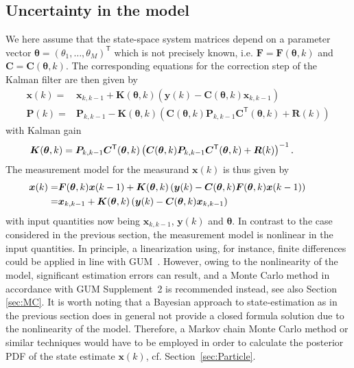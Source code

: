 \documentclass[10pt]{article}
\begin{document}
\begin{spacing}{1}
\subsection{Uncertainty in the model}
\label{sec:LKF_uncertain}
We here assume that the state-space system matrices depend on a parameter vector $\bm{\theta}=(\theta_1,\ldots,\theta_M)^{\mathsf{T}}$ which is not precisely known, i.e. $\bm{F}=\bm{F}(\bm{\theta},k)$ and $\bm{C}=\bm{C}(\bm{\theta},k)$. The corresponding equations for the correction step of the Kalman filter are then given by
\begin{align}
	\bm{x}(k) =& \bm{x}_{k,k-1} + \bm{K}(\bm{\theta},k) \left( \bm{y}(k) - \bm{C}(\bm{\theta},k)\bm{x}_{k,k-1} \right) \\
	\bm{P}(k) =& \bm{P}_{k,k-1} - \bm{K}(\bm{\theta},k) \left( \bm{C}(\bm{\theta},k)\bm{P}_{k,k-1}\bm{C}^{\mathsf{T}}(\bm{\theta},k) + \bm{R}(k) \right)
\end{align}
with Kalman gain
\begin{equation}
	\hspace{-8ex}\bm{K}(\bm{\theta},k) = \bm{P}_{k,k-1}\bm{C}^{\mathsf{T}}(\bm{\theta},k) \left( \bm{C}(\bm{\theta},k)\bm{P}_{k,k-1}\bm{C}^{\mathsf{T}}(\bm{\theta},k)+\bm{R}(k) \right)^{-1} .
\end{equation}
The measurement model for the measurand $\bm{x}(k)$ is thus given by
\begin{align}
	\hspace{-8ex}\bm{x}(k) =& \bm{F}(\bm{\theta},k)\bm{x}(k-1) + \bm{K}(\bm{\theta},k) \left( \bm{y}(k) - \bm{C}(\bm{\theta},k)\bm{F}(\bm{\theta},k)\bm{x}(k-1) \right) \\
	 =& \bm{x}_{k,k-1} + \bm{K}(\bm{\theta},k)\left( \bm{y}(k) - \bm{C}(\bm{\theta},k)\bm{x}_{k,k-1} \right) \label{eq:LKF_GUMmodel}
\end{align}
with input quantities now being $\bm{x}_{k,k-1}$, $\bm{y}(k)$ and $\bm{\theta}$. In contrast to the case considered in the previous section, the measurement model is nonlinear in the input quantities. In principle, a linearization using, for instance, finite differences could be applied in line with GUM~\cite{GUM}. However, owing to the nonlinearity of the model, significant estimation errors can result, and a Monte Carlo method in accordance with GUM Supplement~2 \cite{GUMS2} is recommended instead, see also Section \ref{sec:MC}. It is worth noting that a Bayesian approach to state-estimation as in the previous section does in general not provide a closed formula solution due to the nonlinearity of the model. Therefore, a Markov chain Monte Carlo method or similar techniques would have to be employed in order to calculate the posterior PDF of the state estimate $\bm{x}(k)$, cf. Section~\ref{sec:Particle}.


\end{spacing}
\end{document}

